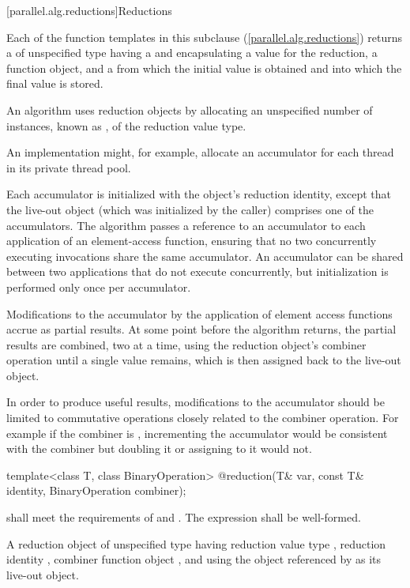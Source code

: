 [parallel.alg.reductions]{Reductions}

\pnum
Each of the function templates in this subclause
(\ref{parallel.alg.reductions}) returns a  of unspecified type
having a  and encapsulating a  value for
the reduction, a  function object, and a  from which the
initial value is obtained and into which the final value is stored.

\pnum
An algorithm uses reduction objects by allocating an unspecified number
of instances, known as , of the reduction value type. \begin{note}An
implementation might, for example, allocate an accumulator for each thread in
its private thread pool.\end{note} Each accumulator is initialized with the
object's reduction identity, except that the live-out object (which was
    initialized by the caller) comprises one of the accumulators. The algorithm
passes a reference to an accumulator to each application of an element-access
function, ensuring that no two concurrently executing invocations share the
same accumulator. An accumulator can be shared between two applications that do
not execute concurrently, but initialization is performed only once per
accumulator.

\pnum
Modifications to the accumulator by the application of element access
functions accrue as partial results. At some point before the algorithm
returns, the partial results are combined, two at a time, using the reduction
object's combiner operation until a single value remains, which is then
assigned back to the live-out object. \begin{note}In order to produce useful
results, modifications to the accumulator should be limited to commutative
operations closely related to the combiner operation. For example if the
combiner is , incrementing the accumulator would be consistent with the
combiner but doubling it or assigning to it would not.\end{note}

\begin{itemdecl}
template<class T, class BinaryOperation>
  @\unspec@ reduction(T& var, const T& identity, BinaryOperation combiner);
\end{itemdecl}

\begin{itemdescr}
  \pnum
  \requires {} shall meet the requirements of  and . The expression  shall be well-formed.

  \pnum
  \returns A reduction object of unspecified type having reduction value type , reduction identity , combiner function object , and using the object referenced by  as its live-out object.
\end{itemdescr}

